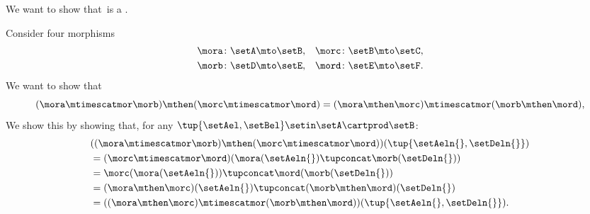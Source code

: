 \begin{example}
    \label{ex:setfunstack}
    We want to show that~\SetL is a .

    Consider four morphisms
    \begin{equation}
        \begin{aligned}
            \mora\colon \setA \mto \setB, & \quad \morc\colon \setB \mto \setC, \\
            \morb\colon \setD \mto \setE, & \quad \mord\colon \setE  \mto \setF.
            \\
        \end{aligned}
    \end{equation}
    We want to show that
    \begin{equation}
        (\mora \mtimescatmor \morb )
        \mthen (\morc \mtimescatmor \mord )
        =
        (\mora \mthen \morc ) \mtimescatmor (\morb \mthen \mord ),
    \end{equation}
    We show this by showing that, for any $\tup{\setAel,\setBel}\setin \setA\cartprod\setB$:
    \begin{equation}
        \begin{aligned}
             & ((\mora \mtimescatmor \morb )\mthen (\morc \mtimescatmor \mord ))(\tup{\setAeln{},\setDeln{}}) \\
             & = (\morc \mtimescatmor \mord)(\mora(\setAeln{})\tupconcat \morb(\setDeln{})) \\
             & =\morc(\mora(\setAeln{}))\tupconcat \mord(\morb(\setDeln{})) \\
             & =(\mora \mthen \morc)(\setAeln{})\tupconcat (\morb\mthen \mord)(\setDeln{}) \\
             & =((\mora \mthen \morc ) \mtimescatmor (\morb \mthen \mord ))(\tup{\setAeln{}, \setDeln{}}).
        \end{aligned}
    \end{equation}
\end{example}
%
